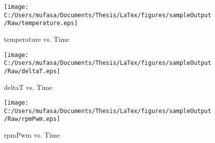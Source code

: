 \begin{figure}[]
	\centering
	\caption{temperature vs. Time}
		\texttt{[image: C:/Users/mufasa/Documents/Thesis/LaTex/figures/sampleOutput/Raw/temperature.eps]}
\end{figure}
\begin{figure}[]
	\centering
	\caption{deltaT vs. Time}
		\texttt{[image: C:/Users/mufasa/Documents/Thesis/LaTex/figures/sampleOutput/Raw/deltaT.eps]}
\end{figure}
\begin{figure}[]
	\centering
	\caption{rpmPwm vs. Time}
		\texttt{[image: C:/Users/mufasa/Documents/Thesis/LaTex/figures/sampleOutput/Raw/rpmPwm.eps]}
\end{figure}
